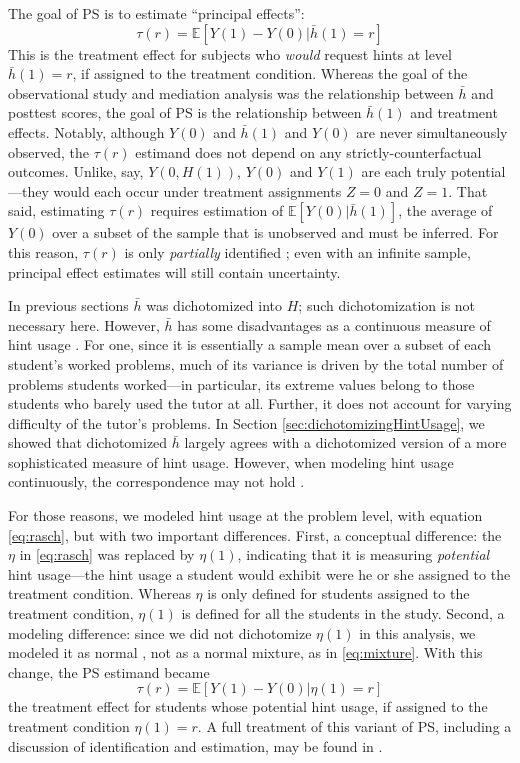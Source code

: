 \documentclass{article}\usepackage[]{graphicx}\usepackage[]{color}
\newcommand{\EE}{\mathbb{E}}
\begin{document}
The goal of PS is to estimate ``principal
effects'':
\begin{equation*}
\tau(r)=\EE[Y(1)-Y(0)|\bar{h}(1)=r]
\end{equation*}
This is the treatment effect for subjects who \emph{would} request
hints at level $\bar{h}(1)=r$, if assigned to the treatment condition.
Whereas the goal of the observational study and mediation
analysis was the relationship between $\bar{h}$ and posttest scores, the
goal of PS is the relationship between $\bar{h}(1)$ and treatment effects.
Notably, although $Y(0)$ and $\bar{h}(1)$ and $Y(0)$ are never
simultaneously observed, the $\tau(r)$ estimand does not depend on any
strictly-counterfactual outcomes.
Unlike, say, $Y(0,H(1))$, $Y(0)$ and $Y(1)$ are each truly
potential---they would each occur under treatment assignments $Z=0$
and $Z=1$.
That said, estimating $\tau(r)$ requires estimation of
$\EE[Y(0)|\bar{h}(1)]$, the average of $Y(0)$ over a subset of the
sample that is unobserved and must be inferred.
For this reason, $\tau(r)$ is only \emph{partially} identified
\citep[e.g.][]{mealli2016identification}; even with an infinite
sample, principal effect estimates will still contain uncertainty.

In previous sections $\bar{h}$ was dichotomized into $H$; such
dichotomization is not necessary here.
However, $\bar{h}$ has some disadvantages as a continuous measure of
hint usage \citep{aoas}.
For one, since it is essentially a sample mean over a subset of each student's
worked problems, much of its variance is driven by the total number of
problems students worked---in particular, its extreme values belong to
those students who barely used the tutor at all.
Further, it does not account for varying difficulty of the tutor's
problems.
In Section \ref{sec:dichotomizingHintUsage}, we showed that
dichotomized $\bar{h}$ largely agrees with a dichotomized version of a
more sophisticated measure of hint usage.
However, when modeling hint usage continuously, the correspondence may
not hold \citep[see][for a more complete discussion]{aoas}.

For those reasons, we modeled hint usage at the problem level, with
equation \eqref{eq:rasch}, but with two important differences.
First, a conceptual difference: the $\eta$ in \eqref{eq:rasch} was
replaced by $\eta (1)$, indicating that it is measuring
\emph{potential} hint usage---the hint usage a student would exhibit
were he or she assigned to the treatment condition.
Whereas $\eta$ is only defined for students assigned to the treatment condition,
$\eta(1)$ is defined for all the students in the study.
Second, a modeling difference: since we did not dichotomize $\eta(1)$
in this analysis, we modeled it as normal , not as a normal mixture, as in
\eqref{eq:mixture}.
With this change, the PS estimand became
\begin{equation*}
\tau(r)=\EE[Y(1)-Y(0)|\eta(1)=r]
\end{equation*}
the treatment effect for students whose potential hint usage, if assigned to the treatment condition $\eta(1)=r$.
A full treatment of this variant of PS, including a
discussion of identification and estimation, may be found in
\citet{aoas}.
\end{document}
